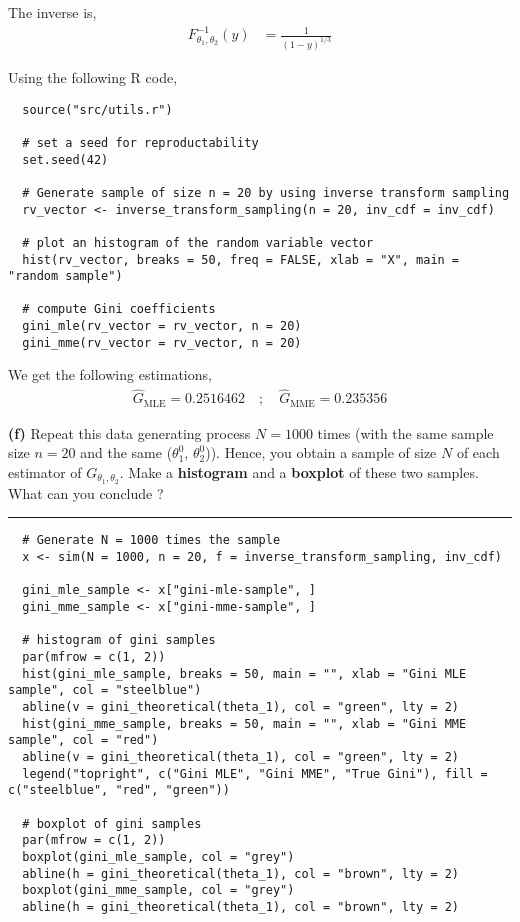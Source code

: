 \documentclass[10pt, a4paper, nofootinbib]{scrartcl}
\begin{document}
The inverse is, 
\begin{align*}
  F^{-1}_{\theta_1, \theta_2}(y) 
    &= \frac{1}{(1-y)^{1/3}}
\end{align*}

Using the following R code,
\begin{verbatim}
  source("src/utils.r")

  # set a seed for reproductability
  set.seed(42)

  # Generate sample of size n = 20 by using inverse transform sampling
  rv_vector <- inverse_transform_sampling(n = 20, inv_cdf = inv_cdf)

  # plot an histogram of the random variable vector
  hist(rv_vector, breaks = 50, freq = FALSE, xlab = "X", main = "random sample")

  # compute Gini coefficients
  gini_mle(rv_vector = rv_vector, n = 20)
  gini_mme(rv_vector = rv_vector, n = 20)
\end{verbatim}

We get the following estimations,
\begin{equation}
  \begin{array}{rl}
    \hat{G}_{\text{MLE}} = 0.2516462 \quad ; \quad \hat{G}_{\text{MME}} = 0.235356
  \end{array}
\end{equation}

\textbf{(f)} Repeat this data generating process $N = 1000$ times (with the same sample size $n = 20$ and the same ($\theta_1^0$, $\theta_2^0$)). Hence, you obtain a sample of size $N$ of each estimator of $G_{\theta_1, \theta_2}$. Make a \textbf{histogram} and a \textbf{boxplot} of these two samples. What can you conclude ?

\begin{center}\rule{6cm}{0.4pt}\end{center}

\begin{verbatim}
  # Generate N = 1000 times the sample
  x <- sim(N = 1000, n = 20, f = inverse_transform_sampling, inv_cdf)

  gini_mle_sample <- x["gini-mle-sample", ]
  gini_mme_sample <- x["gini-mme-sample", ]

  # histogram of gini samples
  par(mfrow = c(1, 2))
  hist(gini_mle_sample, breaks = 50, main = "", xlab = "Gini MLE sample", col = "steelblue")
  abline(v = gini_theoretical(theta_1), col = "green", lty = 2)
  hist(gini_mme_sample, breaks = 50, main = "", xlab = "Gini MME sample", col = "red")
  abline(v = gini_theoretical(theta_1), col = "green", lty = 2)
  legend("topright", c("Gini MLE", "Gini MME", "True Gini"), fill = c("steelblue", "red", "green"))

  # boxplot of gini samples
  par(mfrow = c(1, 2))
  boxplot(gini_mle_sample, col = "grey")
  abline(h = gini_theoretical(theta_1), col = "brown", lty = 2)
  boxplot(gini_mme_sample, col = "grey")
  abline(h = gini_theoretical(theta_1), col = "brown", lty = 2)
\end{verbatim}
\end{document}
